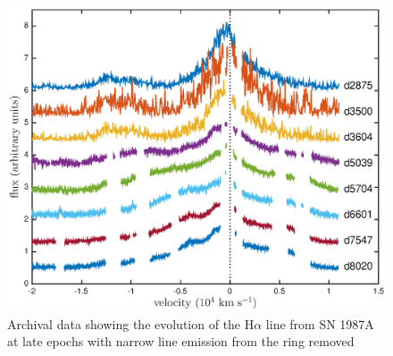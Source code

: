 \documentclass[useAMS,usenatbib,usegraphicx]{mnras}
\begin{document}
\begin{figure}
\includegraphics[trim =45 10 45 15,clip=true,scale=0.51]{Ha_evol_late_1col}
\caption{Archival data showing the evolution of the H$\alpha$ line from SN 1987A at late epochs with narrow line emission from the ring removed}
\label{Ha_evol_late}
\end{figure}
\end{document}
